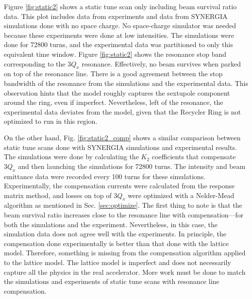 Figure \ref{fig:static2} shows a static tune scan only including beam survival ratio data. This plot includes data from experiments and data from SYNERGIA simulations done with no space charge. No space-charge simulator was needed because these experiments were done at low intensities. The simulations were done for 72800 turns, and the experimental data was partitioned to only this equivalent time window. Figure \ref{fig:static2} shows the resonance stop band corresponding to the $3Q_x$ resonance. Effectively, no beam survives when parked on top of the resonance line. There is a good agreement between the stop bandwidth of the resonance from the simulations and the experimental data. This observation hints that the model roughly captures the sextupole component around the ring, even if imperfect. Nevertheless, left of the resonance, the experimental data deviates from the model, given that the Recycler Ring is not optimized to run in this region.

On the other hand, Fig. \ref{fig:static2_comp} shows a similar comparison between static tune scans done with SYNERGIA simulations and experimental results. The simulations were done by calculating the $K_2$ coefficients that compensate $3Q_x$ and then launching the simulations for 72800 turns. The intensity and beam emittance data were recorded every 100 turns for these simulations. Experimentally, the compensation currents were calculated from the response matrix method, and losses on top of $3Q_x$ were optimized with a Nelder-Mead algorithm as mentioned in Sec. \ref{sec:optimize}. The first thing to note is that the beam survival ratio increases close to the resonance line with compensation---for both the simulations and the experiment. Nevertheless, in this case, the simulation data does not agree well with the experiments. In principle, the compensation done experimentally is better than that done with the lattice model. Therefore, something is missing from the compensation algorithm applied to the lattice model. The lattice model is imperfect and does not necessarily capture all the physics in the real accelerator. More work must be done to match the simulations and experiments of static tune scans with resonance line compensation. 

